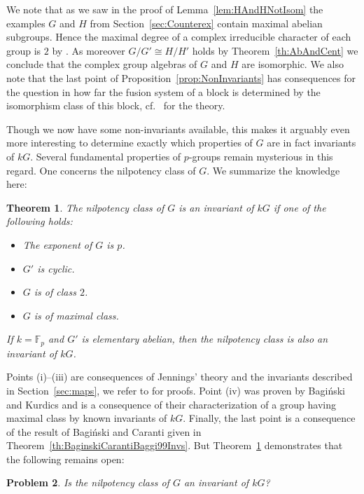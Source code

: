 \documentclass[11pt, a4paper]{amsart}
\newtheorem{theorem}{Theorem}[section]
\newtheorem{problem}[theorem]{Problem}
\theoremstyle{definition}
\begin{document}
We note that as we saw in the proof of Lemma~\ref{lem:HAndHNotIsom} the examples $G$ and $H$ from Section~\ref{sec:Counterex} contain maximal abelian subgroups. Hence the maximal degree of a complex irreducible character of each group is $2$ by \cite[(12.11) Theorem]{Isaacs}. As moreover $G/G' \cong H/H'$ holds by Theorem~\ref{th:AbAndCent} we conclude that the complex group algebras of $G$ and $H$ are isomorphic. We also note that the last point of Proposition~\ref{prop:NonInvariants} has consequences for the question in how far the fusion system of a block is determined by the isomorphism class of this block, cf.\ \cite[Section 8.5]{LinckelmannVolII} for the theory.

Though we now have some non-invariants available, this makes it arguably even more interesting to determine exactly which properties of $G$ are in fact invariants of $kG$. Several fundamental properties of $p$-groups remain mysterious in this regard. One concerns the nilpotency class of $G$. We summarize the knowledge here:

\begin{theorem}\label{th:Class}
The nilpotency class of $G$ is an invariant of $kG$ if one of the following holds:
\begin{itemize}
\item[(i)] The exponent of $G$ is $p$.
\item[(ii)] $G'$ is cyclic.
\item[(iii)] $G$ is of class $2$.
\item[(iv)] $G$ is of maximal class.
\end{itemize}
If $k = \mathbb{F}_p$ and $G'$ is elementary abelian, then the nilpotency class is also an invariant of $kG$.
\end{theorem}

Points (i)--(iii) are consequences of Jennings' theory and the invariants described in Section~\ref{sec:maps}, we refer to \cite{BaginskiKonovalov07} for proofs. Point (iv) was proven by Bagi\'nski and Kurdics \cite[Corollary 3.1]{BaginskiKurdics} and is a consequence of their characterization of a group having maximal class by known invariants of $kG$. Finally, the last point is a consequence of the result of Bagi\'nski and Caranti given in Theorem~\ref{th:BaginskiCarantiBaggi99Invs}. But Theorem~\ref{th:Class} demonstrates that the following remains open:

\begin{problem}
Is the nilpotency class of $G$ an invariant of $kG$?
\end{problem}
\end{document}
